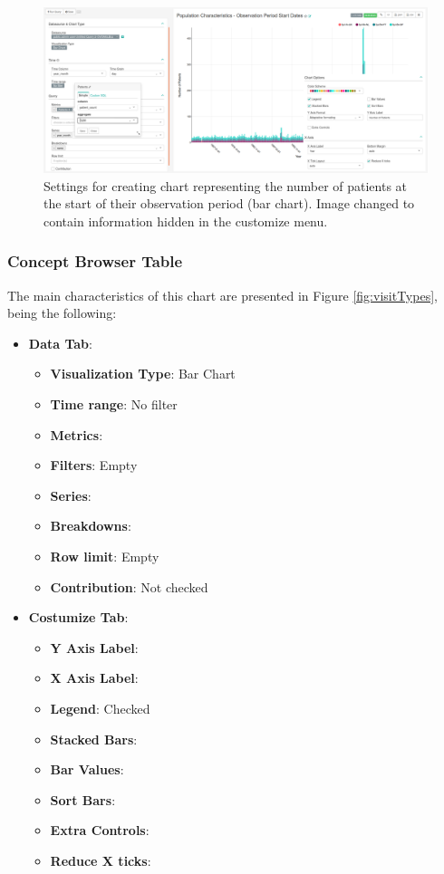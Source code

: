 \documentclass[
]{book}
\providecommand{\tightlist}{%
  \setlength{\itemsep}{0pt}\setlength{\parskip}{0pt}}
\begin{document}
\begin{figure}
\includegraphics[width=1\linewidth]{images/populationCharacteristicsObservationPeriodStartDates} \caption{Settings for creating chart representing the number of patients at the start of their observation period (bar chart). Image changed to contain information hidden in the customize menu.}\label{fig:visitTypes8}
\end{figure}

\hypertarget{concept-browser-table}{%
\subsubsection{Concept Browser Table}\label{concept-browser-table}}

The main characteristics of this chart are presented in Figure \ref{fig:visitTypes}, being the following:

\begin{itemize}
\tightlist
\item
  \textbf{Data Tab}:

  \begin{itemize}
  \tightlist
  \item
    \textbf{Visualization Type}: Bar Chart
  \item
    \textbf{Time range}: No filter
  \item
    \textbf{Metrics}:
  \item
    \textbf{Filters}: Empty
  \item
    \textbf{Series}:
  \item
    \textbf{Breakdowns}:
  \item
    \textbf{Row limit}: Empty
  \item
    \textbf{Contribution}: Not checked
  \end{itemize}
\item
  \textbf{Costumize Tab}:

  \begin{itemize}
  \tightlist
  \item
    \textbf{Y Axis Label}:
  \item
    \textbf{X Axis Label}:
  \item
    \textbf{Legend}: Checked
  \item
    \textbf{Stacked Bars}:
  \item
    \textbf{Bar Values}:
  \item
    \textbf{Sort Bars}:
  \item
    \textbf{Extra Controls}:
  \item
    \textbf{Reduce X ticks}:
  \end{itemize}
\end{itemize}
\end{document}
